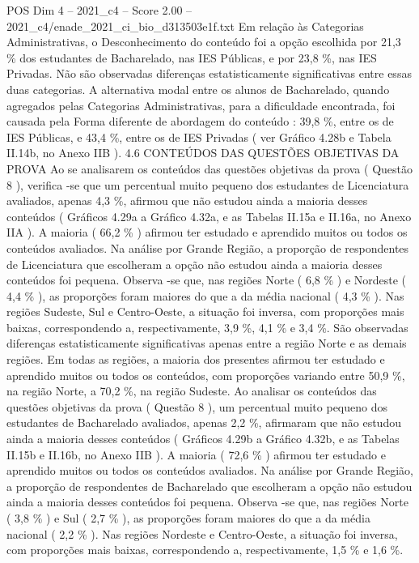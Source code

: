 \begin{textsample}{POS Dim 4 – 2021\_c4 – Score 2.00 – 2021\_c4/enade\_2021\_ci\_bio\_d313503e1f.txt}
Em relação às Categorias Administrativas, o Desconhecimento do conteúdo foi a opção escolhida por 21,3 \% dos estudantes de Bacharelado, nas IES Públicas, e por 23,8 \%, nas IES Privadas.
Não são observadas diferenças estatisticamente significativas entre essas duas categorias.
A alternativa modal entre os alunos de Bacharelado, quando agregados pelas Categorias Administrativas, para a dificuldade encontrada, foi causada pela Forma diferente de abordagem do conteúdo : 39,8 \%, entre os de IES Públicas, e 43,4 \%, entre os de IES Privadas ( ver Gráfico 4.28b e Tabela II.14b, no Anexo IIB ). 4.6 CONTEÚDOS DAS QUESTÕES OBJETIVAS DA PROVA Ao se analisarem os conteúdos das questões objetivas da prova ( Questão 8 ), verifica -se que um percentual muito pequeno dos estudantes de Licenciatura avaliados, apenas 4,3 \%, afirmou que não estudou ainda a maioria desses conteúdos ( Gráficos 4.29a a Gráfico 4.32a, e as Tabelas II.15a e II.16a, no Anexo IIA ).
A maioria ( 66,2 \% ) afirmou ter estudado e aprendido muitos ou todos os conteúdos avaliados.
Na análise por Grande Região, a proporção de respondentes de Licenciatura que escolheram a opção não estudou ainda a maioria desses conteúdos foi pequena.
Observa -se que, nas regiões Norte ( 6,8 \% ) e Nordeste ( 4,4 \% ), as proporções foram maiores do que a da média nacional ( 4,3 \% ).
Nas regiões Sudeste, Sul e Centro-Oeste, a situação foi inversa, com proporções mais baixas, correspondendo a, respectivamente, 3,9 \%, 4,1 \% e 3,4 \%.
São observadas diferenças estatisticamente significativas apenas entre a região Norte e as demais regiões.
Em todas as regiões, a maioria dos presentes afirmou ter estudado e aprendido muitos ou todos os conteúdos, com proporções variando entre 50,9 \%, na região Norte, a 70,2 \%, na região Sudeste.
Ao analisar os conteúdos das questões objetivas da prova ( Questão 8 ), um percentual muito pequeno dos estudantes de Bacharelado avaliados, apenas 2,2 \%, afirmaram que não estudou ainda a maioria desses conteúdos ( Gráficos 4.29b a Gráfico 4.32b, e as Tabelas II.15b e II.16b, no Anexo IIB ).
A maioria ( 72,6 \% ) afirmou ter estudado e aprendido muitos ou todos os conteúdos avaliados.
Na análise por Grande Região, a proporção de respondentes de Bacharelado que escolheram a opção não estudou ainda a maioria desses conteúdos foi pequena.
Observa -se que, nas regiões Norte ( 3,8 \% ) e Sul ( 2,7 \% ), as proporções foram maiores do que a da média nacional ( 2,2 \% ).
Nas regiões Nordeste e Centro-Oeste, a situação foi inversa, com proporções mais baixas, correspondendo a, respectivamente, 1,5 \% e 1,6 \%.

\end{textsample}
